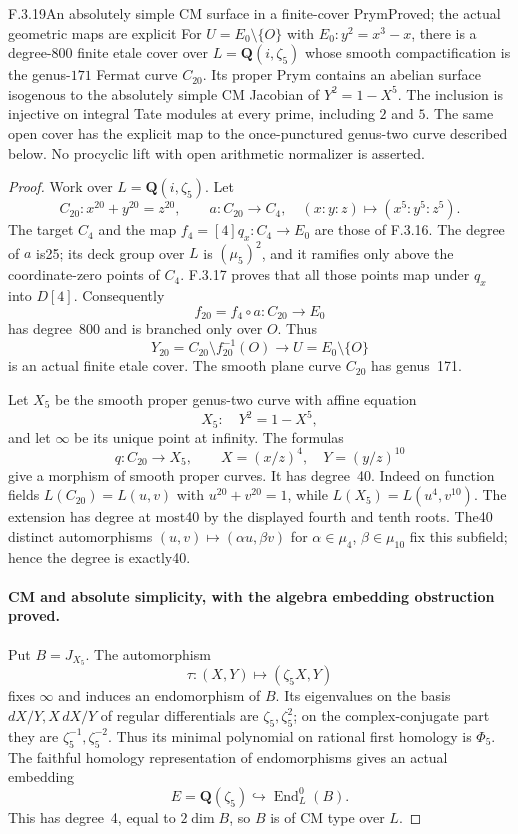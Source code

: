 \begin{result}{F.3.19}{An absolutely simple CM surface in a finite-cover Prym}{Proved; the actual geometric maps are explicit}
For $U=E_0\setminus\{O\}$ with $E_0:y^2=x^3-x$, there is a degree-$800$ finite etale cover over $L=\mathbf Q(i,\zeta_5)$ whose smooth compactification is the genus-$171$ Fermat curve $C_{20}$. Its proper Prym contains an abelian surface isogenous to the absolutely simple CM Jacobian of $Y^2=1-X^5$. The inclusion is injective on integral Tate modules at every prime, including $2$ and $5$. The same open cover has the explicit map to the once-punctured genus-two curve described below. No procyclic lift with open arithmetic normalizer is asserted.
\end{result}
\begin{proof}
Work over $L=\mathbf Q(i,\zeta_5)$. Let
\[
 C_{20}:x^{20}+y^{20}=z^{20},\qquad
 a:C_{20}\longrightarrow C_4,\quad(x:y:z)\longmapsto(x^5:y^5:z^5).
\]
The target $C_4$ and the map $f_4=[4]q_x:C_4\to E_0$ are those of
F.3.16. The degree of $a$ is25; its deck group over $L$ is
$(\mu_5)^2$, and it ramifies only above the coordinate-zero points of
$C_4$. F.3.17 proves that all those points map under $q_x$ into $D[4]$.
Consequently
\[
 f_{20}=f_4\circ a:C_{20}\to E_0
\]
has degree~800 and is branched only over $O$. Thus
\[
 Y_{20}=C_{20}\setminus f_{20}^{-1}(O)\longrightarrow
 U=E_0\setminus\{O\}
\]
is an actual finite etale cover. The smooth plane curve $C_{20}$ has
genus~171.

Let $X_5$ be the smooth proper genus-two curve with affine equation
\[
 X_5:\quad Y^2=1-X^5,
\]
and let $\infty$ be its unique point at infinity. The formulas
\[
 q:C_{20}\longrightarrow X_5,\qquad
 X=(x/z)^4,\quad Y=(y/z)^{10}
\]
give a morphism of smooth proper curves. It has degree~40. Indeed on
function fields $L(C_{20})=L(u,v)$ with $u^{20}+v^{20}=1$, while
$L(X_5)=L(u^4,v^{10})$. The extension has degree at most40 by the
displayed fourth and tenth roots. The40 distinct automorphisms
$(u,v)\mapsto(\alpha u,\beta v)$ for
$\alpha\in\mu_4$, $\beta\in\mu_{10}$ fix this subfield; hence the
degree is exactly40.

\paragraph{CM and absolute simplicity, with the algebra embedding obstruction proved.}
Put $B=J_{X_5}$. The automorphism
\[
 \tau:(X,Y)\longmapsto(\zeta_5X,Y)
\]
fixes $\infty$ and induces an endomorphism of $B$. Its eigenvalues on
the basis $dX/Y,X\,dX/Y$ of regular differentials are
$\zeta_5,\zeta_5^2$; on the complex-conjugate part they are
$\zeta_5^{-1},\zeta_5^{-2}$. Thus its minimal polynomial on rational
first homology is $\Phi_5$. The faithful homology representation of
endomorphisms gives an actual embedding
\[
 E=\mathbf Q(\zeta_5)\hookrightarrow\operatorname{End}^0_L(B).
\]
This has degree~4, equal to $2\dim B$, so $B$ is of CM type over $L$.


\end{proof}
